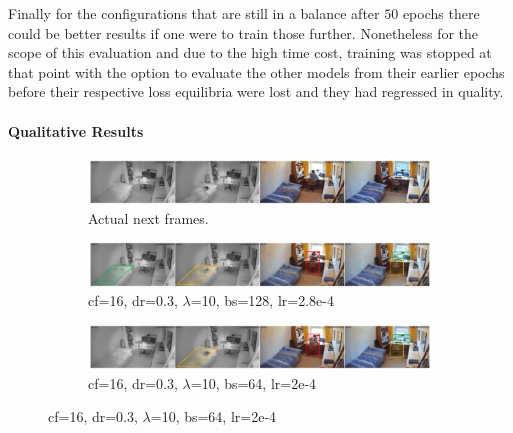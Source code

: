 Finally for the configurations that are still in a balance after $50$ epochs there could be better results if one were to train those further. Nonetheless for the scope of this evaluation and due to the high time cost, training was stopped at that point with the option to evaluate the other models from their earlier epochs before their respective loss equilibria were lost and they had regressed in quality.

\paragraph{Qualitative Results}

\begin{figure}
  \centering

	\begin{subfigure}{\textwidth}
		\centering
		\includegraphics[width=\textwidth]{graphics/eval/cvgan_2/qual_basic/actual/actual.pdf}
	  \caption{Actual next frames.}
	  \label{subfig:cvgan_comparison_bs}
	\end{subfigure}
	
	\begin{subfigure}{\textwidth}
	  \centering
		\includegraphics[width=\textwidth]{graphics/eval/cvgan_2/qual_basic/dfilter-16_ddropout-0.3_lambda-10_batchsize-128_learningrate-0.00028/predicted.pdf}
		\caption{cf=16, dr=0.3, $\lambda$=10, bs=128, lr=2.8e-4}
		\label{subfig:bs128-comp-2}
	\end{subfigure}

	\begin{subfigure}{\textwidth}
		\centering
		\includegraphics[width=\textwidth]{graphics/eval/cvgan_2/qual_basic/dfilter-16_ddropout-0.3_lambda-10_batchsize-64_learningrate-0.0002/predicted.pdf}
	  \caption{cf=16, dr=0.3, $\lambda$=10, bs=64, lr=2e-4}
	  \label{subfig:bs64-comp-2}
	\end{subfigure}


\end{figure}

